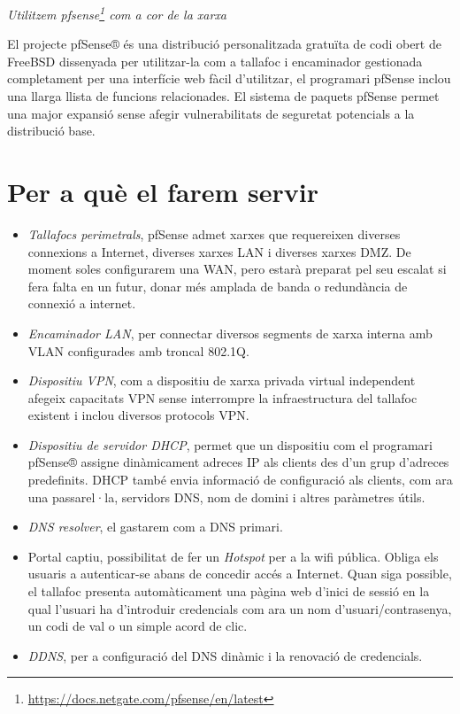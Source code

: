 \documentclass[
  10pt,
]{krantz}
\DeclareRobustCommand{\href}[2]{#2\footnote{\url{#1}}}
\begin{document}
\emph{Utilitzem \href{https://docs.netgate.com/pfsense/en/latest}{pfsense} com a cor de la xarxa}

El projecte pfSense® és una distribució personalitzada gratuïta de codi obert de FreeBSD dissenyada per utilitzar-la com a tallafoc i encaminador gestionada completament per una interfície web fàcil d'utilitzar, el programari pfSense inclou una llarga llista de funcions relacionades. El sistema de paquets pfSense permet una major expansió sense afegir vulnerabilitats de seguretat potencials a la distribució base.

\hypertarget{per-a-quuxe8-el-farem-servir}{%
\section{Per a què el farem servir}\label{per-a-quuxe8-el-farem-servir}}

\begin{itemize}
\item
  \emph{Tallafocs perimetrals}, pfSense admet xarxes que requereixen diverses connexions a Internet, diverses xarxes LAN i diverses xarxes DMZ. De moment soles configurarem una WAN, pero estarà preparat pel seu escalat si fera falta en un futur, donar més amplada de banda o redundància de connexió a internet.
\item
  \emph{Encaminador LAN}, per connectar diversos segments de xarxa interna amb VLAN configurades amb troncal 802.1Q.
\item
  \emph{Dispositiu VPN}, com a dispositiu de xarxa privada virtual independent afegeix capacitats VPN sense interrompre la infraestructura del tallafoc existent i inclou diversos protocols VPN.
\item
  \emph{Dispositiu de servidor DHCP}, permet que un dispositiu com el programari pfSense® assigne dinàmicament adreces IP als clients des d'un grup d'adreces predefinits. DHCP també envia informació de configuració als clients, com ara una passarel·la, servidors DNS, nom de domini i altres paràmetres útils.
\item
  \emph{DNS resolver}, el gastarem com a DNS primari.
\item
  Portal captiu, possibilitat de fer un \emph{Hotspot} per a la wifi pública. Obliga els usuaris a autenticar-se abans de concedir accés a Internet. Quan siga possible, el tallafoc presenta automàticament una pàgina web d'inici de sessió en la qual l'usuari ha d'introduir credencials com ara un nom d'usuari/contrasenya, un codi de val o un simple acord de clic.
\item
  \emph{DDNS}, per a configuració del DNS dinàmic i la renovació de credencials.
\end{itemize}
\end{document}
